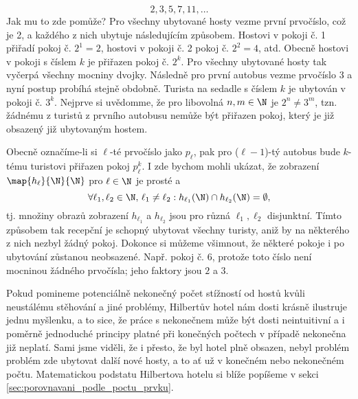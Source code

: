 \begin{enumerate}[label=\textit{(\roman*)}]
    \begin{equation*}
        2,3,5,7,11,\dots
    \end{equation*}
    Jak mu to zde pomůže? Pro všechny ubytované hosty vezme první prvočíslo, což je 2, a každého z nich ubytuje následujícím způsobem. Hostovi v pokoji č. 1 přiřadí pokoj č. $2^1=2$, hostovi v pokoji č. 2 pokoj č. $2^2=4$, atd. Obecně hostovi v pokoji s číslem $k$ je přiřazen pokoj č. $2^k$. Pro všechny ubytované hosty tak vyčerpá všechny mocniny dvojky. Následně pro první autobus vezme prvočíslo 3 a nyní postup probíhá stejně obdobně. Turista na sedadle s číslem $k$ je ubytován v pokoji č. $3^k$. Nejprve si uvědomme, že pro libovolná $n,m\in\N$ je $2^n\neq 3^m$, tzn. žádnému z turistů z prvního autobusu nemůže být přiřazen pokoj, který je již obsazený již ubytovaným hostem.\par
    Obecně označíme-li si $\ell$-té prvočíslo jako $p_\ell$, pak pro ($\ell-1$)-tý autobus bude $k$-tému turistovi přiřazen pokoj $p_\ell^k$. I zde bychom mohli ukázat, že zobrazení $\map{h_\ell}{\N}{\N}$ pro $\ell\in\N$ je prosté a
    \begin{equation*}
        \forall\ell_1,\ell_2\in\N,\,\ell_1\neq\ell_2: h_{\ell_1}(\N)\cap h_{\ell_2}(\N)=\emptyset,
    \end{equation*}
    tj. množiny obrazů zobrazení $h_{\ell_1}$ a $h_{\ell_2}$ jsou pro různá $\ell_1,\ell_2$ disjunktní. Tímto způsobem tak recepční je schopný ubytovat všechny turisty, aniž by na některého z nich nezbyl žádný pokoj. Dokonce si můžeme všimnout, že některé pokoje i po ubytování zůstanou neobsazené. Např. pokoj č. 6, protože toto číslo není mocninou žádného prvočísla; jeho faktory jsou $2$ a $3$.
\end{enumerate}
Pokud pomineme potenciálně nekonečný počet stížností od hostů kvůli neustálému stěhování a jiné problémy, Hilbertův hotel nám dosti krásně ilustruje jednu myšlenku, a to sice, že práce s nekonečnem může být dosti neintuitivní a i poměrně jednoduché principy platné při konečných počtech v případě nekonečna již neplatí. Sami jsme viděli, že i přesto, že byl hotel plně obsazen, nebyl problém problém zde ubytovat další nové hosty, a to ať už v konečném nebo nekonečném počtu. Matematickou podstatu Hilbertova hotelu si blíže popíšeme v sekci \ref{sec:porovnavani_podle_poctu_prvku}.